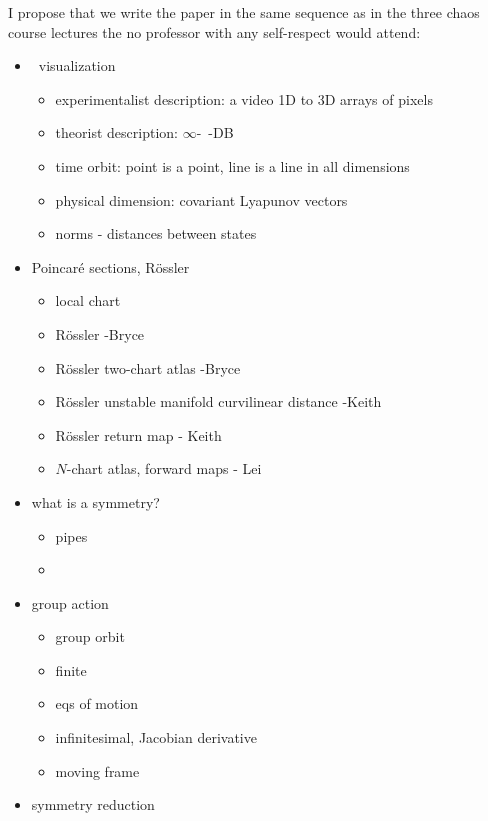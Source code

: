 I propose that we write the
paper in the same sequence as in the three chaos course lectures
the no professor with any self-respect would attend:

\begin{itemize}
  \item \statesp\ visualization
    \begin{itemize}
      \item experimentalist description: a video 1D to 3D arrays of pixels
      \item theorist description: $\infty$-\dmn\ \statesp -DB
      \item time orbit: point is a point, line is a line in all dimensions
      \item physical dimension: covariant Lyapunov vectors
      \item norms - distances between states
    \end{itemize}
  \item Poincar\'e sections, R\"ossler
    \begin{itemize}
      \item local chart
      \item R\"ossler {\poincBord} -Bryce
      \item R\"ossler two-chart atlas -Bryce
      \item R\"ossler unstable manifold curvilinear distance -Keith
      \item R\"ossler return map - Keith
      \item $N$-chart atlas, forward maps - Lei
    \end{itemize}
  \item what is a symmetry?
    \begin{itemize}
      \item pipes
      \item \cLe
    \end{itemize}
  \item group action
    \begin{itemize}
      \item group orbit
      \item finite
      \item eqs of motion
      \item infinitesimal, Jacobian derivative
      \item moving frame
    \end{itemize}
  \item symmetry reduction
    \begin{itemize}

\end{itemize}
\end{itemize}
